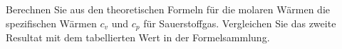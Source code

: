 Berechnen Sie aus den theoretischen Formeln für die molaren Wärmen die spezifischen Wärmen $c_v$ und $c_p$ für Sauerstoffgas. Vergleichen Sie das zweite Resultat mit dem tabellierten Wert in der Formelsammlung.
